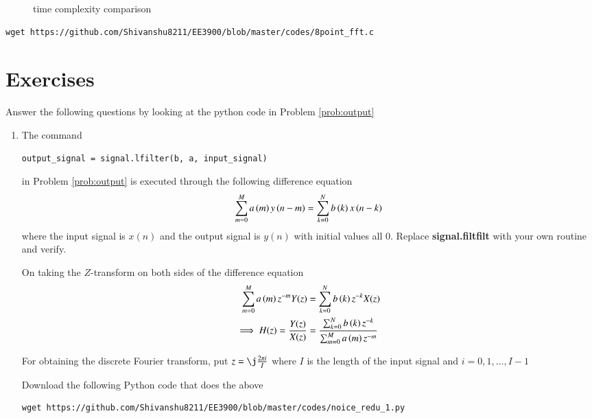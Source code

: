 \documentclass[journal,12pt,twocolumn]{IEEEtran}
\renewcommand\thesection{\arabic{section}}
\begin{document}
\begin{enumerate}[label=\arabic*.,ref=\thesection.\theenumi]
\begin{figure}[!ht]
               \caption{time complexity comparison}
               \label{time complexity comparison}
          \end{figure}
          \begin{lstlisting}
wget https://github.com/Shivanshu8211/EE3900/blob/master/codes/8point_fft.c
          \end{lstlisting}
     \end{enumerate}
     
     \section{Exercises}
     Answer the following questions by looking at the python code in Problem \ref{prob:output}
     \begin{enumerate}[label=\thesection.\arabic*]
          \item The command
               \begin{lstlisting}
output_signal = signal.lfilter(b, a, input_signal)
               \end{lstlisting}
               in Problem \ref{prob:output} is executed through the following difference equation
               \begin{equation}
                    \label{eq:iir_filter_gen}
                    \sum _{m=0}^{M}a\left(m\right)y\left(n-m\right)=\sum _{k=0}^{N}b\left(k\right)x\left(n-k\right)
               \end{equation}
               where the input signal is $x(n)$ and the output signal is $y(n)$ with initial values all 0. Replace \textbf{signal.filtfilt} with your own routine and verify.

               \solution On taking the $Z$-transform on both sides of the difference equation
               \begin{align}
                    \sum _{m=0}^{M}a\left(m\right) z^{-m} Y(z) & = \sum _{k=0}^{N}b\left(k\right) z^{-k} X(z)                                    \\
                    \implies H(z) = \frac{Y(z)}{X(z)}    & = \frac{\sum _{k=0}^{N}b\left(k\right) z^{-k}}{\sum _{m=0}^{M}a\left(m\right) z^{-m}}
               \end{align}

               For obtaining the discrete Fourier transform, put $z = \j \frac{2\pi i}{I}$ where $I$ is the length of the input signal and $i = 0, 1, \ldots, I-1$

               Download the following Python code that does the above
               \begin{lstlisting}
wget https://github.com/Shivanshu8211/EE3900/blob/master/codes/noice_redu_1.py
               \end{lstlisting}


\end{enumerate}
\end{document}
